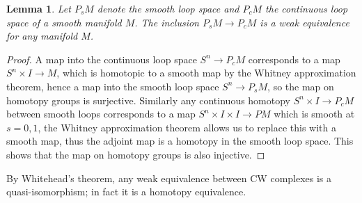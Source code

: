 \documentclass{scrartcl}
\theoremstyle{plain}
\newtheorem{lemma}[theorem]{Lemma}
\theoremstyle{definition}
\newtheorem{remark}[theorem]{Remark}
\newcommand{\from}{\leftarrow}
\DeclareMathOperator{\Map}{Map}
\begin{document}
\begin{lemma}
Let $P_sM$ denote the smooth loop space and $P_cM$ the continuous loop space of a smooth manifold $M$. The inclusion $P_sM\to P_cM$ is a weak equivalence for any manifold $M$. 
\end{lemma}
\begin{proof}
    A map into the continuous loop space $S^n\to P_cM$ corresponds to a map $S^n\times I\to M$, which is homotopic to a smooth map by the Whitney approximation theorem, hence a map into the smooth loop space $S^n\to P_sM$, so the map on homotopy groups is surjective. Similarly any continuous homotopy $S^n\times I\to P_cM$ between smooth loops corresponds to a map $S^n\times I \times I\to PM$ which is smooth at $s=0, 1$, the Whitney approximation theorem allows us to replace this with a smooth map, thus the adjoint map is a homotopy in the smooth loop space. This shows that the map on homotopy groups is also injective. %
\end{proof}

By Whitehead's theorem, any weak equivalence between CW complexes is a quasi-isomorphism; in fact it is a homotopy equivalence. 



\end{document}

